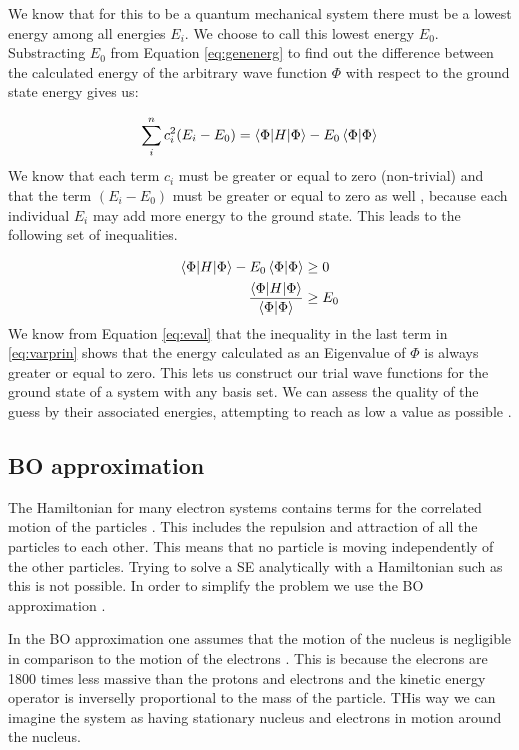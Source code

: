 \documentclass[../master_thesis.tex]{subfiles}
\begin{document}
We know that for this to be a quantum mechanical system there must be a lowest
energy among all energies $E_i$. We choose to call this lowest energy $E_0$.
Substracting $E_0$ from Equation \ref{eq:genenerg} to find out the difference
between the calculated energy of the arbitrary wave function $\Phi$ with respect
to the ground state energy gives us:

\begin{equation}
   \sum\limits_i^nc_i^2(E_i - E_0) = \braket{\Phi | H | \Phi} -
   E_0\braket{\Phi | \Phi}
\end{equation}
We know that each term $c_i$ must be greater or equal to zero (non-trivial) and
that the term $(E_i - E_0)$ must be greater or equal to zero as well
\cite{Cramer:2004}, because each individual $E_i$ may add more energy to the
ground state. This leads to the following set of inequalities.

\begin{equation}
  \begin{split} \label{eq:varprin}
    \braket{\Phi | H | \Phi} - E_0\braket{\Phi | \Phi} & \geq 0 \\
    \frac{\braket{\Phi | H | \Phi}}{\braket{\Phi | \Phi}} & \geq E_0
  \end{split}
\end{equation}
We know from Equation \ref{eq:eval} that the inequality in the last term in
\ref{eq:varprin} shows that the energy calculated as an Eigenvalue of $\Phi$ is
always greater or equal to zero. This lets us construct our trial wave functions
for the ground state of a system with any basis set. We can assess the quality
of the guess by their associated energies, attempting to reach as low a value
as possible \cite{Cramer:2004}.

\subsection{\ac{BO} approximation}

The Hamiltonian for many electron systems contains terms for the correlated
motion of the particles \cite{Cramer:2004, Jensen:2017}. This includes the
repulsion and attraction of all the particles to each other. This means that no
particle is moving independently of the other particles. Trying to solve a
\ac{SE} analytically with a Hamiltonian such as this is not possible. In order
to simplify the problem we use the \ac{BO} approximation \cite{Cramer:2004,
Jensen:2017}.

In the \ac{BO} approximation one assumes that the motion of the nucleus is
negligible in comparison to the motion of the electrons \cite{Cramer:2004,
Jensen:2017}. This is because the elecrons are 1800 times less massive than the
protons and electrons and the kinetic energy operator is inverselly
proportional to the mass of the particle. THis way we can imagine the system as
having stationary nucleus and electrons in motion around the nucleus.
\end{document}
